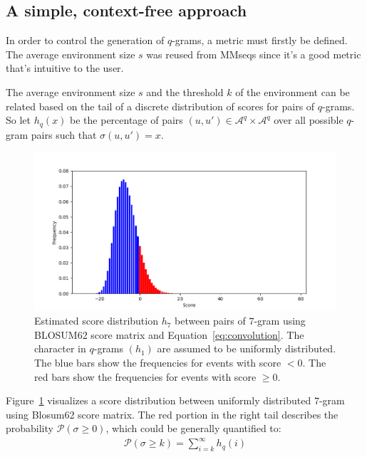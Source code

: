 \documentclass[twoside,a4paper,bsc]{master}
\newcommand{\Qgram}[1]{\(#1\)-gram}
\newcommand{\Alpha}[0]{\mathcal{A}}
\begin{document}
\subsection{A simple, context-free approach}
In order to control the generation of \Qgram{q}s, a metric must firstly be
defined. The average environment size \(s\) was reused from MMseqs since
it's a good metric that's intuitive to the user.

The average environment size \(s\) and the threshold \(k\) of the
environment can be related based on the tail
of a discrete distribution of scores for pairs of \(q\)-grams. So let
\(h_{q}(x)\) be the percentage of pairs
\((u,u')\in\Alpha^{q}\times\Alpha^{q}\) over all possible \Qgram{q} pairs such 
that \(\sigma(u,u')=x\).

\begin{figure}[t]
\begin{center}
\includegraphics[scale=0.6]{graphics/distribution.png}
\end{center}
\caption{Estimated score distribution \(h_7\) between pairs of \Qgram{7}
using
BLOSUM62 score matrix and Equation~\ref{eq:convolution}. The character in
\Qgram{q}s \((h_1)\) are assumed to be uniformly distributed. The blue bars
show
the frequencies for events with
score \(<0\). The red bars show the frequencies for events with
score \(\geq 0\).}
\label{fig:distribution}
\end{figure}

Figure~\ref{fig:distribution} visualizes a score distribution between uniformly 
distributed \Qgram{7} using Blosum62 score matrix. The red portion in the right
tail describes the probability \(\mathcal{P}(\sigma \geq 0)\), which could
be generally quantified to:
\begin{align}
\mathcal{P}(\sigma \geq k) = \sum_{i = k}^\infty h_q(i)
\end{align}
\end{document}
